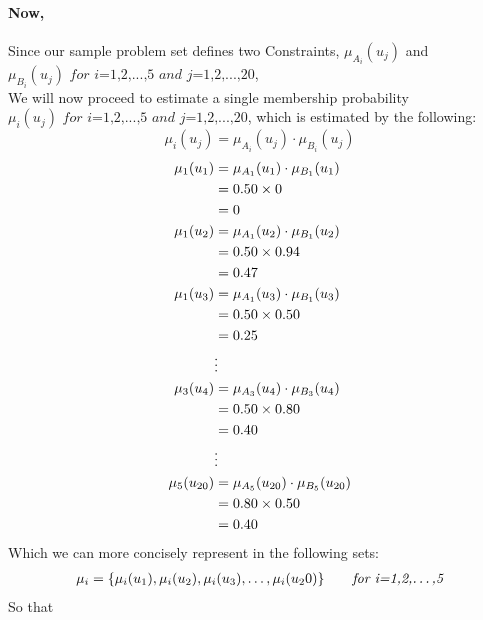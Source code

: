 \documentclass[a4paper,openany]{book}
\begin{document}
			\paragraph{Now,}
				Since our sample problem set defines two Constraints, $\mu_{A_i}(u_j)$ and $\mu_{B_i}(u_j) \textit{ for i=1,2,...,5 and j=1,2,...,20}$, \\
				We will now proceed to estimate a single membership probability $\mu_i(u_j)  \textit{ for i=1,2,...,5 and j=1,2,...,20}$, which is estimated by the following:
				\begin{equation}
					\mu_i(u_j) = \mu_{A_i}(u_j) \cdot \mu_{B_i}(u_j)
				\end{equation}
				\begin{align}
					\mu_1(u_1) &= \mu_{A_1}(u_1) \cdot \mu_{B_1}(u_1) \\
					&= 0.50 \times 0 \notag \\
					&= 0 \notag\\
					\mu_1(u_2) &= \mu_{A_1}(u_2) \cdot \mu_{B_1}(u_2) \\
					&= 0.50 \times 0.94 \notag \\
					&= 0.47 \notag\\
					\mu_1(u_3) &= \mu_{A_1}(u_3) \cdot \mu_{B_1}(u_3) \\
					&= 0.50 \times 0.50 \notag \\
					&= 0.25 \notag\\
					&\vdots \notag \\
					\mu_3(u_4) &= \mu_{A_3}(u_4) \cdot \mu_{B_3}(u_4) \\
					&= 0.50 \times 0.80 \notag \\
					&= 0.40 \notag\\
					&\vdots \notag \\
					\mu_5(u_{20}) &= \mu_{A_5}(u_{20}) \cdot \mu_{B_5}(u_{20}) \\
					&= 0.80 \times 0.50 \notag \\
					&= 0.40 \notag\\
				\end{align}
				Which we can more concisely represent in the following sets:
				\begin{align}
					\mu_i = \{ \mu_i(u_1), \mu_i(u_2), \mu_i(u_3),\dots,\mu_i(u_20) \} \qquad \textit{for i=1,2,\dots,5}
				\end{align}
				So that
\end{document}
